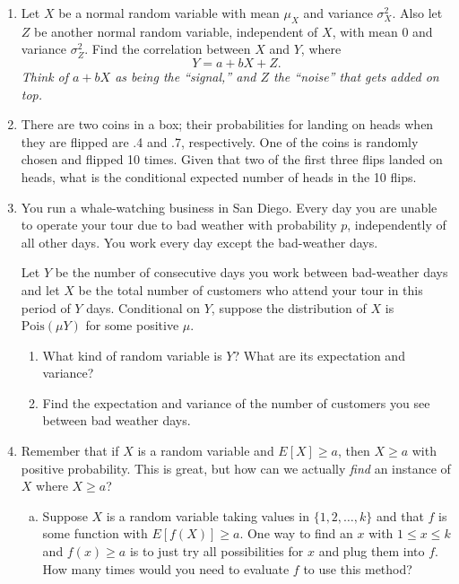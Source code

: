 \documentclass[11pt,letterpaper]{article}
\begin{document}
\begin{enumerate}
    \item Let $X$ be a normal random variable with mean $\mu_X$ and variance $\sigma_X^2$.
    Also let $Z$ be another normal random variable, independent of $X$, with mean 0 and variance $\sigma_Z^2$.
    Find the correlation between $X$ and $Y$, where
    \[
        Y = a + bX + Z.
    \]
    \emph{Think of $a+bX$ as being the ``signal,'' and $Z$ the ``noise'' that gets added on top.}


    \item There are two coins in a box; their probabilities for landing on heads when they are flipped are .4 and .7, respectively. One of the coins is randomly chosen and flipped 10 times.
    Given that two of the first three flips landed on heads, what is the conditional expected number of heads in the 10 flips.


    \item You run a whale-watching business in San Diego.
    Every day you are unable to operate your tour due to bad weather with probability $p$, independently of all other days.
    You work every day except the bad-weather days.

    Let $Y$ be the number of consecutive days you work between bad-weather days and let $X$ be the total number of customers who attend your tour in this period of $Y$ days.
    Conditional on $Y$, suppose the distribution of $X$ is $\text{Pois}(\mu Y)$ for some positive $\mu$.

    \begin{enumerate}
        \item What kind of random variable is $Y$? What are its expectation and variance?

        \item Find the expectation and variance of the number of customers you see between bad weather days.
    \end{enumerate}



    \item Remember that if $X$ is a random variable and $E[X] \geq a$, then $X\geq a$ with positive probability.
    This is great, but how can we actually \emph{find} an instance of $X$ where $X\geq a$?

    \begin{enumerate}[(a)]
        \item Suppose $X$ is a random variable taking values in $\{1, 2, \ldots, k\}$ and that $f$ is some function with $E[f(X)] \geq a$.
        One way to find an $x$ with $1\leq x\leq k$ and $f(x) \geq a$ is to just try all possibilities for $x$ and plug them into $f$.
        How many times would you need to evaluate $f$ to use this method?


\end{enumerate}
\end{enumerate}
\end{document}
